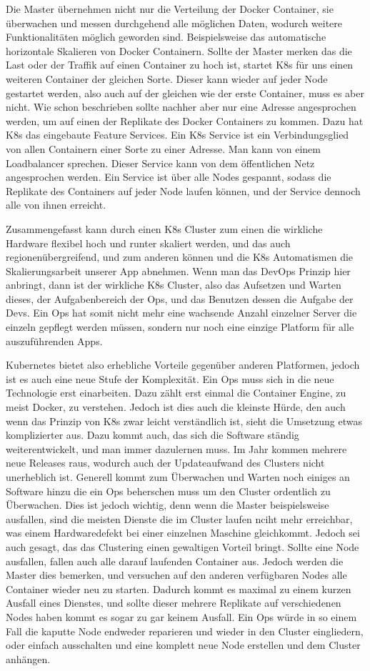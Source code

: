 Die Master übernehmen nicht nur die Verteilung der Docker Container, sie überwachen und messen durchgehend alle möglichen Daten, wodurch weitere Funktionalitäten möglich geworden sind.
Beispielsweise das automatische horizontale Skalieren von Docker Containern. Sollte der Master merken das die Last oder der Traffik auf einen Container zu hoch ist, startet K8s für uns einen weiteren Container der gleichen Sorte. 
Dieser kann wieder auf jeder Node gestartet werden, also auch auf der gleichen wie der erste Container, muss es aber nicht.
Wie schon beschrieben sollte nachher aber nur eine Adresse angesprochen werden, um auf einen der Replikate des Docker Containers zu kommen. Dazu hat K8s das eingebaute Feature Services. Ein K8s Service ist ein Verbindungsglied
von allen Containern einer Sorte zu einer Adresse. Man kann von einem Loadbalancer sprechen. Dieser Service kann von dem öffentlichen Netz angesprochen werden. Ein Service ist über alle Nodes gespannt, sodass die 
Replikate des Containers auf jeder Node laufen können, und der Service dennoch alle von ihnen erreicht.

Zusammengefasst kann durch einen K8s Cluster zum einen die wirkliche Hardware flexibel hoch und runter skaliert werden, und das auch regionenübergreifend, und zum anderen können und die K8s Automatismen die Skalierungsarbeit unserer App abnehmen.
Wenn man das DevOps Prinzip hier anbringt, dann ist der wirkliche K8s Cluster, also das Aufsetzen und Warten dieses, der Aufgabenbereich der Ops, und das Benutzen dessen die Aufgabe der Devs.
Ein Ops hat somit nicht mehr eine wachsende Anzahl einzelner Server die einzeln gepflegt werden müssen, sondern nur noch eine einzige Platform für alle auszuführenden Apps.

Kubernetes bietet also erhebliche Vorteile gegenüber anderen Platformen, jedoch ist es auch eine neue Stufe der Komplexität.
Ein Ops muss sich in die neue Technologie erst einarbeiten. Dazu zählt erst einmal die Container Engine, zu meist Docker, zu verstehen.
Jedoch ist dies auch die kleinste Hürde, den auch wenn das Prinzip von K8s zwar leicht verständlich ist, sieht die Umsetzung etwas komplizierter aus.
Dazu kommt auch, das sich die Software ständig weiterentwickelt, und man immer dazulernen muss. Im Jahr kommen mehrere neue Releases raus, wodurch 
auch der Updateaufwand des Clusters nicht unerheblich ist. Generell kommt zum Überwachen und Warten noch einiges an Software hinzu die ein Ops beherschen muss um 
den Cluster ordentlich zu Überwachen.
Dies ist jedoch wichtig, denn wenn die Master beispielsweise ausfallen, sind die meisten Dienste die im Cluster laufen nciht mehr erreichbar, was einem Hardwaredefekt bei einer einzelnen Maschine gleichkommt.
Jedoch sei auch gesagt, das das Clustering einen gewaltigen Vorteil bringt. Sollte eine Node ausfallen, fallen auch alle darauf laufenden Container aus. Jedoch werden die Master dies bemerken, 
und versuchen auf den anderen verfügbaren Nodes alle Container wieder neu zu starten. Dadurch kommt es maximal zu einem kurzen Ausfall eines Dienstes, und sollte dieser mehrere Replikate auf verschiedenen Nodes haben kommt es sogar zu gar keinem Ausfall.
Ein Ops würde in so einem Fall die kaputte Node endweder reparieren und wieder in den Cluster eingliedern, oder einfach ausschalten und eine komplett neue Node erstellen und dem Cluster anhängen.